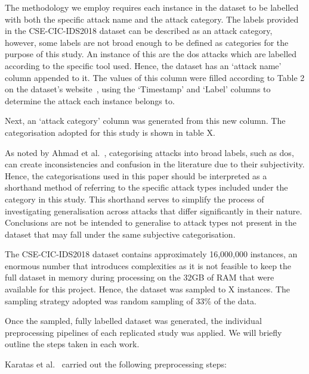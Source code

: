 The methodology we employ requires each instance in the dataset to be labelled
with both the specific attack name and the attack category. The labels provided
in the CSE-CIC-IDS2018 dataset can be described as an attack category, however,
some labels are not broad enough to be defined as categories for the
purpose of this study. An instance of this are the \gls{dos} attacks which are
labelled according to the specific tool used. Hence, the dataset has an
`attack name' column appended to it. The values of this column were filled
according to Table 2 on the dataset's website~\cite{cic2018}, using the `Timestamp'
and `Label' columns to determine the attack each instance belongs to.

Next, an `attack category' column was generated from this new column. The
categorisation adopted for this study is shown in table X.


As noted by Ahmad et al.~\cite{zero-day}, categorising attacks
into broad labels, such as \gls{dos}, can create inconsistencies and confusion
in the literature due to their subjectivity. Hence, the categorisations used in
this paper should be interpreted as a shorthand method of referring to the
specific attack types included under the category in this study. This shorthand
serves to simplify the process of investigating generalisation across attacks
that differ significantly in their nature. Conclusions are not be intended to
generalise to attack types not present in the dataset that may fall under the
same subjective categorisation.

The CSE-CIC-IDS2018 dataset contains approximately 16,000,000 instances, an
enormous number that introduces complexities as it is not feasible to keep the
full dataset in memory during processing on the 32GB of RAM that were available
for this project. Hence, the dataset was sampled to X instances. The sampling
strategy adopted was random sampling of 33\% of the data.

Once the sampled, fully labelled dataset was generated, the individual
preprocessing pipelines of each replicated study was applied. We will briefly
outline the steps taken in each work.

Karatas et al.~\cite{Karatas} carried out the following preprocessing steps:

